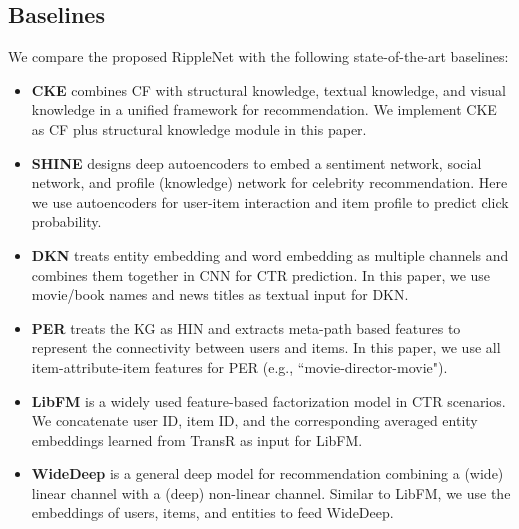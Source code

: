 \documentclass[sigconf]{acmart}
\begin{document}
	\subsection{Baselines}
		We compare the proposed RippleNet with the following state-of-the-art baselines:
		\begin{itemize}
			\item
				\textbf{CKE} \cite{zhang2016collaborative} combines CF with structural knowledge, textual knowledge, and visual knowledge in a unified framework for recommendation.
				We implement CKE as CF plus structural knowledge module in this paper.
			\item
				\textbf{SHINE} \cite{wang2018shine} designs deep autoencoders to embed a sentiment network, social network, and profile (knowledge) network for celebrity recommendation.
				Here we use autoencoders for user-item interaction and item profile to predict click probability.
			\item
				\textbf{DKN} \cite{wang2018dkn}	treats entity embedding and word embedding as multiple channels and combines them together in CNN for CTR prediction.
				In this paper, we use movie/book names and news titles as textual input for DKN.
			\item
				\textbf{PER} \cite{yu2014personalized} treats the KG as HIN and extracts meta-path based features to represent the connectivity between users and items.
				In this paper, we use all item-attribute-item features for PER (e.g., ``movie-director-movie").
			\item
				\textbf{LibFM} \cite{rendle2012factorization} is a widely used feature-based factorization model in CTR scenarios.
				We concatenate user ID, item ID, and the corresponding averaged entity embeddings learned from TransR \cite{lin2015learning} as input for LibFM.
			\item
				\textbf{WideDeep} \cite{cheng2016wide} is a general deep model for recommendation combining a (wide) linear channel with a (deep) non-linear channel.
				Similar to LibFM, we use the embeddings of users, items, and entities to feed WideDeep.
		\end{itemize}
		
\end{document}
